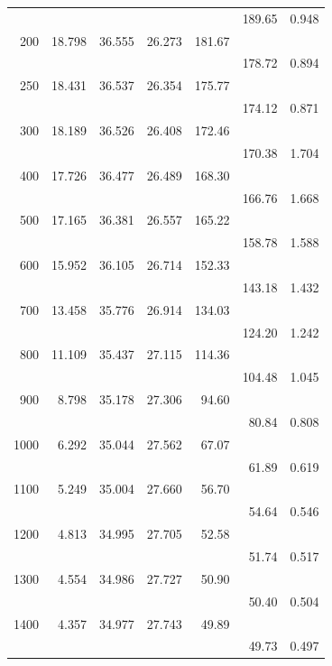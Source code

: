 \begin{table}[t!]
\begin{tabular*}{108mm}{@{}rrrrrrl}
 &            &       &       &       & 189.65& 0.948\\
200&    18.798& 36.555& 26.273& 181.67& \\
 &            &       &       &       & 178.72& 0.894\\
250&    18.431& 36.537& 26.354& 175.77& \\
 &            &       &       &       & 174.12& 0.871\\
300&    18.189& 36.526& 26.408& 172.46& \\
 &            &       &       &       & 170.38& 1.704\\
400&    17.726& 36.477& 26.489& 168.30& \\
 &            &       &       &       & 166.76& 1.668\\
500&    17.165& 36.381& 26.557& 165.22& \\
 &            &       &       &       & 158.78& 1.588\\
600&    15.952& 36.105& 26.714& 152.33& \\
 &            &       &       &       & 143.18& 1.432\\
700&    13.458& 35.776& 26.914& 134.03& \\
 &            &       &       &       & 124.20& 1.242\\
800&    11.109& 35.437& 27.115& 114.36& \\
 &            &       &       &       & 104.48& 1.045\\
900&    8.798&  35.178& 27.306& 94.60&  \\
 &            &       &       &       & 80.84&  0.808\\
1000&   6.292&  35.044& 27.562& 67.07&  \\
 &            &       &       &       & 61.89&  0.619\\
1100&   5.249&  35.004& 27.660& 56.70&  \\
 &            &       &       &       & 54.64&  0.546\\
1200&   4.813&  34.995& 27.705& 52.58&  \\
 &            &       &       &       & 51.74&  0.517\\
1300&   4.554&  34.986& 27.727& 50.90&  \\
 &            &       &       &       & 50.40&  0.504\\
1400&   4.357&  34.977& 27.743& 49.89&  \\
 &            &       &       &       & 49.73&  0.497\\

\end{tabular*}
\end{table}
